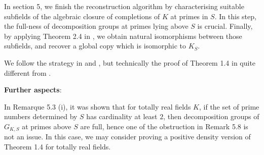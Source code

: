 \documentclass{article}
\theoremstyle{plain}
\theoremstyle{definition}
\theoremstyle{remark}
\begin{document}
In section 5, we finish the reconstruction algorithm by characterising suitable subfields of the algebraic closure of completions of $K$ at primes in $S$. In this step, the full-ness of decomposition groups at primes lying above $S$ is crucial. Finally, by applying Theorem 2.4 in \cite{Shi2}, we obtain natural isomorphisms between those subfields, and recover a global copy which is isomorphic to $K_S$.  \par 
We follow the strategy in \cite{Ho1} and \cite{Ho2}, but technically the proof of Theorem 1.4 in quite different from \cite{Ho2}. \par 
\textbf{Further aspects}:\par 
In \cite{CC} Remarque 5.3 (i), it was shown that for totally real fields $K$, if the set of prime numbers determined by $S$ has cardinality at least $2$, then decomposition groups of $G_{K,S}$ at primes above $S$ are full, hence one of the obstruction in Remark 5.8 is not an issue. In this case, we may consider proving a positive density version of Theorem 1.4 for totally real fields.
\end{document}

